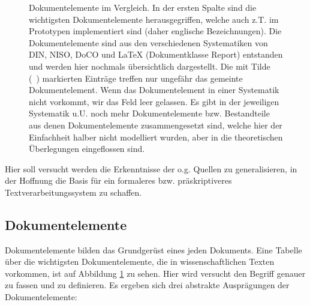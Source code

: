  
\begin{figure}[h!]
\centering
\advance\leftskip-2.5cm
\caption[Dokumentelemente im Vergleich]{ Dokumentelemente im Vergleich. In der ersten Spalte sind die wichtigsten Dokumentelemente herausgegriffen, welche auch z.T. im Prototypen implementiert sind (daher englische Bezeichnungen). Die Dokumentelemente sind aus den verschiedenen Systematiken von DIN, NISO, DoCO und LaTeX (Dokumentklasse Report) entstanden und werden hier nochmals übersichtlich dargestellt. Die mit Tilde (~) markierten Einträge treffen nur ungefähr das gemeinte Dokumentelement. Wenn das Dokumentelement in einer Systematik nicht vorkommt, wir das Feld leer gelassen. Es gibt in der jeweiligen Systematik u.U. noch mehr Dokumentelemente bzw. Bestandteile aus denen Dokumentelemente zusammengesetzt sind, welche hier der Einfachheit halber nicht modelliert wurden, aber in die theoretischen Überlegungen eingeflossen sind. }\label{dokumentelemente-fig}
\end{figure}
 
Hier soll versucht werden die Erkenntnisse der o.g. Quellen zu generalisieren, in der Hoffnung die Basis für ein formaleres bzw. präskriptiveres Textverarbeitungssystem zu schaffen.

 
\subsection{Dokumentelemente}\label{dokumentelemente}
 
Dokumentelemente bilden das Grundgerüst eines jeden Dokuments. Eine Tabelle über die wichtigsten Dokumentelemente, die in wissenschaftlichen Texten vorkommen, ist auf Abbildung \ref{dokumentelemente-fig} zu sehen. Hier wird versucht den Begriff genauer zu fassen und zu definieren. Es ergeben sich drei abstrakte Ausprägungen der Dokumentelemente:

